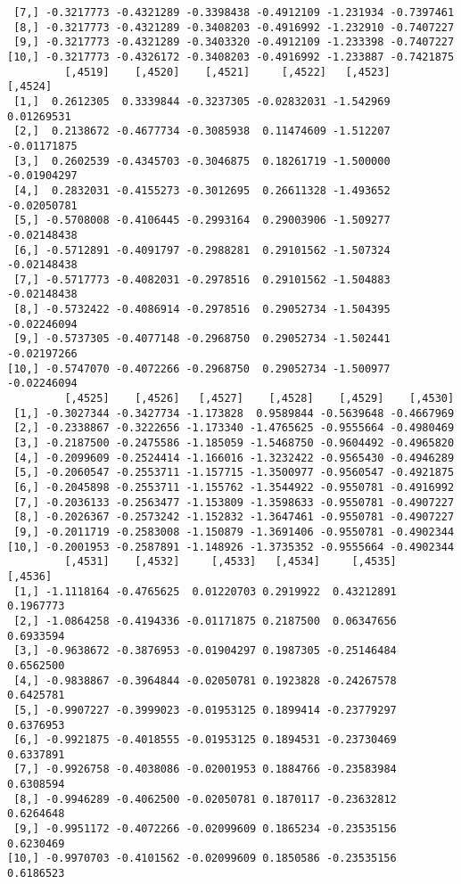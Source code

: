 \documentclass[
  letterpaper,
  DIV=11,
  numbers=noendperiod]{scrreprt}
\begin{document}
\begin{verbatim}
 [7,] -0.3217773 -0.4321289 -0.3398438 -0.4912109 -1.231934 -0.7397461
 [8,] -0.3217773 -0.4321289 -0.3408203 -0.4916992 -1.232910 -0.7407227
 [9,] -0.3217773 -0.4321289 -0.3403320 -0.4912109 -1.233398 -0.7407227
[10,] -0.3217773 -0.4326172 -0.3408203 -0.4916992 -1.233887 -0.7421875
         [,4519]    [,4520]    [,4521]     [,4522]   [,4523]     [,4524]
 [1,]  0.2612305  0.3339844 -0.3237305 -0.02832031 -1.542969  0.01269531
 [2,]  0.2138672 -0.4677734 -0.3085938  0.11474609 -1.512207 -0.01171875
 [3,]  0.2602539 -0.4345703 -0.3046875  0.18261719 -1.500000 -0.01904297
 [4,]  0.2832031 -0.4155273 -0.3012695  0.26611328 -1.493652 -0.02050781
 [5,] -0.5708008 -0.4106445 -0.2993164  0.29003906 -1.509277 -0.02148438
 [6,] -0.5712891 -0.4091797 -0.2988281  0.29101562 -1.507324 -0.02148438
 [7,] -0.5717773 -0.4082031 -0.2978516  0.29101562 -1.504883 -0.02148438
 [8,] -0.5732422 -0.4086914 -0.2978516  0.29052734 -1.504395 -0.02246094
 [9,] -0.5737305 -0.4077148 -0.2968750  0.29052734 -1.502441 -0.02197266
[10,] -0.5747070 -0.4072266 -0.2968750  0.29052734 -1.500977 -0.02246094
         [,4525]    [,4526]   [,4527]    [,4528]    [,4529]    [,4530]
 [1,] -0.3027344 -0.3427734 -1.173828  0.9589844 -0.5639648 -0.4667969
 [2,] -0.2338867 -0.3222656 -1.173340 -1.4765625 -0.9555664 -0.4980469
 [3,] -0.2187500 -0.2475586 -1.185059 -1.5468750 -0.9604492 -0.4965820
 [4,] -0.2099609 -0.2524414 -1.166016 -1.3232422 -0.9565430 -0.4946289
 [5,] -0.2060547 -0.2553711 -1.157715 -1.3500977 -0.9560547 -0.4921875
 [6,] -0.2045898 -0.2553711 -1.155762 -1.3544922 -0.9550781 -0.4916992
 [7,] -0.2036133 -0.2563477 -1.153809 -1.3598633 -0.9550781 -0.4907227
 [8,] -0.2026367 -0.2573242 -1.152832 -1.3647461 -0.9550781 -0.4907227
 [9,] -0.2011719 -0.2583008 -1.150879 -1.3691406 -0.9550781 -0.4902344
[10,] -0.2001953 -0.2587891 -1.148926 -1.3735352 -0.9555664 -0.4902344
         [,4531]    [,4532]     [,4533]   [,4534]     [,4535]   [,4536]
 [1,] -1.1118164 -0.4765625  0.01220703 0.2919922  0.43212891 0.1967773
 [2,] -1.0864258 -0.4194336 -0.01171875 0.2187500  0.06347656 0.6933594
 [3,] -0.9638672 -0.3876953 -0.01904297 0.1987305 -0.25146484 0.6562500
 [4,] -0.9838867 -0.3964844 -0.02050781 0.1923828 -0.24267578 0.6425781
 [5,] -0.9907227 -0.3999023 -0.01953125 0.1899414 -0.23779297 0.6376953
 [6,] -0.9921875 -0.4018555 -0.01953125 0.1894531 -0.23730469 0.6337891
 [7,] -0.9926758 -0.4038086 -0.02001953 0.1884766 -0.23583984 0.6308594
 [8,] -0.9946289 -0.4062500 -0.02050781 0.1870117 -0.23632812 0.6264648
 [9,] -0.9951172 -0.4072266 -0.02099609 0.1865234 -0.23535156 0.6230469
[10,] -0.9970703 -0.4101562 -0.02099609 0.1850586 -0.23535156 0.6186523

\end{verbatim}
\end{document}
